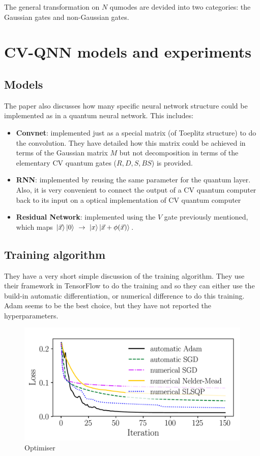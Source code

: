 \documentclass{article}
\begin{document}
The general transformation on $N$ qumodes are devided into two categories: the Gaussian gates and non-Gaussian gates. 

\section{ CV-QNN models and experiments}

\subsection{Models}

The paper also discusses how many specific neural network structure could be  implemented as in a quantum neural network. This includes: 

\begin{itemize}
  \item \textbf{Convnet}: implemented just as a special matrix (of Toeplitz
    structure) to do the convolution. They have detailed how this matrix could
    be achieved in terms of the Gaussian matrix $M$ but not decomposition
    in terms of the elementary CV quantum gates ($R,D,S,BS$) is provided.
  \item \textbf{RNN}: implemented by reusing the same parameter for the quantum
    layer. Also, it is very convenient to connect the output of a CV quantum
    computer back to its input on a optical implementation of CV quantum
    computer
  \item \textbf{Residual Network}: implemented using the $V$ gate previously
    mentioned, which maps $\ket{\vec{x}}\ket{0}~\to~\ket{x}\ket{\vec{x} + \phi(\vec{x})}$.
\end{itemize}

\subsection{Training algorithm}

They have a very short simple discussion of the training algorithm. They use
their framework in TensorFlow to do the training and so they can either use the
build-in automatic differentiation, or numerical difference to do this training.
Adam seems to be the best choice, but they have not reported the hyperparameters.
\begin{figure}[H]
  \centering
  \includegraphics[width=0.8\linewidth]{opt.png}
  \caption{Optimiser}
\end{figure}
\end{document}
